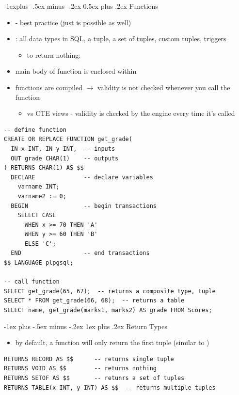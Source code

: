 \documentclass[10pt, landscape]{article}
\makeatletter
\renewcommand{\subsection}{\@startsection{subsection}{2}{0mm}%
  {-1explus -.5ex minus -.2ex}%
  {0.5ex plus .2ex}%
{\normalfont\normalsize\bfseries}}
\renewcommand{\subsubsection}{\@startsection{subsubsection}{3}{0mm}%
  {-1ex plus -.5ex minus -.2ex}%
  {1ex plus .2ex}%
{\normalfont\small\bfseries}}%
\makeatother
\begin{document}
\begin{multicols}{3}
  \subsection{Functions}
  \begin{itemize}
    \item {} - best practice (just  is possible as well)
    \item {}: all data types in SQL, a tuple, a set of tuples, custom tuples, triggers
      \begin{itemize}
        \item to return nothing: 
      \end{itemize}
    \item main body of function is enclosed within \code{\$\$}
    \item functions are compiled $\rightarrow$ validity is not checked whenever you call the function
      \begin{itemize}
        \item vs CTE views - validity is checked by the engine every time it's called
      \end{itemize}
  \end{itemize}
  \begin{lstlisting}[style=mySQL]
-- define function
CREATE OR REPLACE FUNCTION get_grade(
  IN x INT, IN y INT,  -- inputs
  OUT grade CHAR(1)    -- outputs
) RETURNS CHAR(1) AS $$
  DECLARE              -- declare variables
    varname INT;
    varname2 := 0;
  BEGIN                -- begin transactions
    SELECT CASE 
      WHEN x >= 70 THEN 'A'
      WHEN y >= 60 THEN 'B'
      ELSE 'C';
  END                  -- end transactions
$$ LANGUAGE plpgsql;

-- call function
SELECT get_grade(65, 67);  -- returns a composite type, tuple 
SELECT * FROM get_grade(66, 68);  -- returns a table 
SELECT name, get_grade(marks1, marks2) AS grade FROM Scores;
  \end{lstlisting}

  \subsubsection{Return Types}
  \begin{itemize}
    \item by default, a function will only return the first tuple (similar to )
  \end{itemize}
  \begin{lstlisting}[style=mySQL]
RETURNS RECORD AS $$      -- returns single tuple
RETURNS VOID AS $$        -- returns nothing
RETURNS SETOF AS $$       -- retunrs a set of tuples
RETURNS TABLE(x INT, y INT) AS $$  -- returns multiple tuples
  \end{lstlisting}


\end{multicols}
\end{document}
